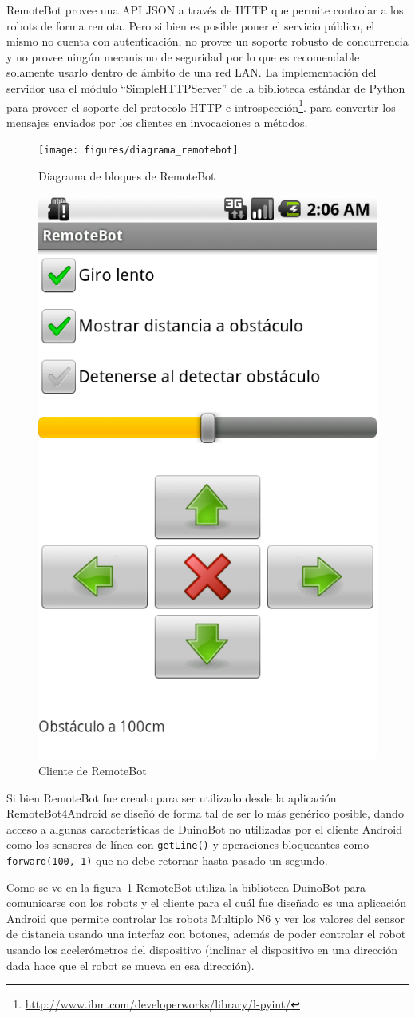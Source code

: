 RemoteBot provee una API JSON a través de HTTP que permite controlar a los
robots de forma remota. Pero si bien es posible poner el servicio público,
el mismo no cuenta con autenticación, no provee un soporte robusto de
concurrencia y no provee ningún mecanismo de seguridad por lo que es
recomendable solamente usarlo dentro de ámbito de una red LAN.
La implementación del servidor
usa el módulo ``SimpleHTTPServer'' de la biblioteca estándar de Python para
proveer el soporte del protocolo HTTP e
introspección\footnote{\url{http://www.ibm.com/developerworks/library/l-pyint/}}.
para convertir los
mensajes enviados por los clientes en invocaciones a métodos.

\begin{figure}
    \centering
    \texttt{[image: figures/diagrama\_remotebot]}
    \caption{Diagrama de bloques de RemoteBot}
    \label{fig:diagrama_remotebot}
\end{figure}
\begin{figure}
    \centering
    \includegraphics[width=.20\textwidth]{figures/cliente_remotebot}
    \caption{Cliente de RemoteBot}
    \label{fig:cliente_remotebot}
\end{figure}

Si bien RemoteBot fue creado para ser utilizado desde la
aplicación RemoteBot4Android
se diseñó de forma tal de ser lo más genérico posible, dando acceso
a algunas características de DuinoBot no utilizadas por el cliente
Android como los sensores de línea con \texttt{getLine()} y operaciones
bloqueantes como \texttt{forward(100, 1)} que no debe retornar
hasta pasado un segundo.

Como se ve en la figura~\ref{fig:diagrama_remotebot} RemoteBot utiliza la
biblioteca DuinoBot para comunicarse con los robots y el cliente para el cuál
fue diseñado es una aplicación Android que permite controlar los robots
Multiplo N6
y ver los valores del sensor de distancia usando una interfaz con botones,
además de poder controlar el robot usando los acelerómetros del dispositivo
(inclinar el dispositivo en una dirección dada hace que el robot se mueva
en esa dirección).

